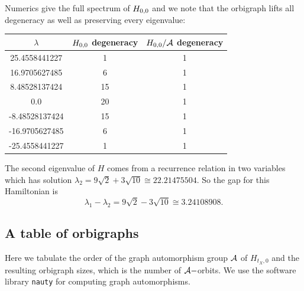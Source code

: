 \documentclass[12pt]{article}
\begin{document}

Numerics give the full spectrum of $H_{0,0}$ and we note that the orbigraph lifts
all degeneracy as well as preserving every eigenvalue:
\begin{center}
\begin{tabular}{ c|c|c } 
$\lambda$ & $H_{0,0}$ degeneracy & $H_{0,0}/\mathcal{A}$ degeneracy \\
\hline
    25.4558441227 & 1 & 1 \\
    16.9705627485 & 6 & 1 \\
    8.48528137424 & 15 & 1 \\
    0.0 & 20 & 1 \\
    -8.48528137424 & 15 & 1 \\
    -16.9705627485 & 6 & 1 \\
    -25.4558441227 & 1 & 1 \\
\end{tabular}
\end{center}

The second eigenvalue of $H$ comes from a recurrence
relation in two variables which has solution
$\lambda_2 = 9\sqrt{2} + 3\sqrt{10} \cong 22.21475504.$
So the gap for this Hamiltonian  is 
$$\lambda_1 - \lambda_2 = 9\sqrt{2} - 3\sqrt{10} \cong 3.24108908.$$



%
\subsection{A table of orbigraphs}\label{OrbigraphTable}

Here we tabulate the order of the graph automorphism group $\mathcal{A}$ of $H_{t_X,0}$
and the resulting orbigraph sizes, which is the number of $\mathcal{A}-$orbits.
We use the software library {\tt nauty}\cite{McKay2014} for computing graph automorphisms.
\end{document}
